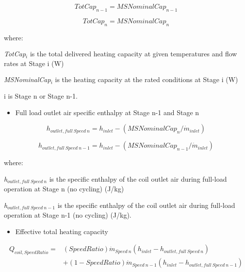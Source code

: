 \begin{equation}
TotCa{p_{n - 1}} = MSNominalCa{p_{n - 1}}
\end{equation}

\begin{equation}
TotCa{p_n} = MSNominalCa{p_n}
\end{equation}

where:

\emph{TotCap\(_{i}\)} is the total delivered heating capacity at given temperatures and flow rates at Stage i (W)

\emph{MSNominalCap\(_{i}\)} is the heating capacity at the rated conditions at Stage i (W)

i is Stage n or Stage n-1.

\begin{itemize}
  \item Full load outlet air specific enthalpy at Stage n-1 and Stage n
\end{itemize}

\begin{equation}
{h_{outlet,full~Speed~n}} = {h_{inlet}} - (MSNominalCa{p_n}/{\dot{m}_{inlet}})
\end{equation}

\begin{equation}
{h_{outlet,full~Speed~n-1}} = {h_{inlet}} - (MSNominalCa{p_{n - 1}}/{\dot{m}_{inlet}})
\end{equation}

where:

\emph{h\(_{outlet,full~Speed~n}\)} is the specific enthalpy of the coil outlet air during full-load operation at Stage n (no cycling) (J/kg)

\emph{h\(_{outlet,full~Speed~n-1}\)} is the specific enthalpy of the coil outlet air during full-load operation at Stage n-1 (no cycling) (J/kg).

\begin{itemize}
  \item Effective total heating capacity
\end{itemize}

\begin{equation}
  \begin{array}{rl}
    Q_{coil,SpeedRatio} =& \left( SpeedRatio \right){\dot{m}_{Speed~n}}(h_{inlet} - h_{outlet,full~Speed~n}) \\
                         &+ (1 - SpeedRatio) {\dot{m}_{Speed~n-1}}(h_{inlet} - h_{outlet,full~Speed~n-1})
  \end{array}
\end{equation}

